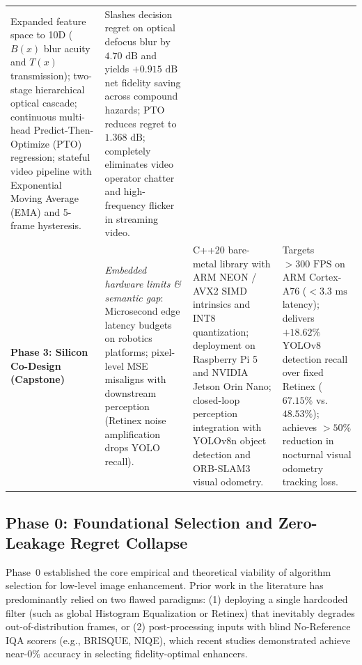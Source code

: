 \documentclass[journal]{IEEEtran}
\begin{document}
\begin{table}[!t]
{\begin{tabular}{lp{4.4cm}p{5.5cm}p{5.5cm}}
Expanded feature space to 10D ($B(x)$ blur acuity and $T(x)$ transmission); two-stage hierarchical optical cascade; continuous multi-head Predict-Then-Optimize (PTO) regression; stateful video pipeline with Exponential Moving Average (EMA) and 5-frame hysteresis. & 
Slashes decision regret on optical defocus blur by $4.70\text{ dB}$ and yields $+0.915\text{ dB}$ net fidelity saving across compound hazards; PTO reduces regret to $1.368\text{ dB}$; completely eliminates video operator chatter and high-frequency flicker in streaming video. \\
\addlinespace
\textbf{Phase 3: Silicon Co-Design (Capstone)} & 
\textit{Embedded hardware limits \& semantic gap}: Microsecond edge latency budgets on robotics platforms; pixel-level MSE misaligns with downstream perception (Retinex noise amplification drops YOLO recall). & 
C++20 bare-metal library with ARM NEON / AVX2 SIMD intrinsics and INT8 quantization; deployment on Raspberry Pi 5 and NVIDIA Jetson Orin Nano; closed-loop perception integration with YOLOv8n object detection and ORB-SLAM3 visual odometry. & 
Targets $>300\text{ FPS}$ on ARM Cortex-A76 ($<3.3\text{ ms}$ latency); delivers $+18.62\%$ YOLOv8 detection recall over fixed Retinex ($67.15\%$ vs. $48.53\%$); achieves $>50\%$ reduction in nocturnal visual odometry tracking loss. \\
\bottomrule
\end{tabular}
}
\end{table}

\subsection{Phase 0: Foundational Selection and Zero-Leakage Regret Collapse}
Phase~0 established the core empirical and theoretical viability of algorithm selection for low-level image enhancement. Prior work in the literature has predominantly relied on two flawed paradigms: (1) deploying a single hardcoded filter (such as global Histogram Equalization or Retinex) that inevitably degrades out-of-distribution frames, or (2) post-processing inputs with blind No-Reference IQA scorers (e.g., BRISQUE, NIQE), which recent studies \cite{lyu2026blindpsnr} demonstrated achieve near-0\% accuracy in selecting fidelity-optimal enhancers.
\end{document}
